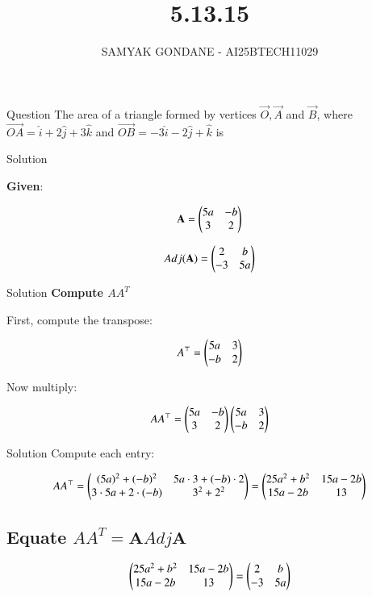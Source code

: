\documentclass{beamer}
\title 
{5.13.15}
\date{}
\author
{SAMYAK GONDANE - AI25BTECH11029}
\begin{document}
\frame{\titlepage}

\begin{frame}{Question}
The area of a triangle formed by vertices $\vec{O}, \vec{A}$ and $\vec{B}$, where $\vec{OA} = \hat{i} + 2\hat{j} + 3\hat{k}$ and $\vec{OB} = -3\hat{i} - 2\hat{j} + \hat{k}$ is
\end{frame}


\begin{frame}{Solution}

\textbf{Given}:

\begin{align}
\textbf{A} = \begin{pmatrix} 5a & -b \\ 3 & 2 \end{pmatrix}
\end{align}


\begin{align}
Adj(\textbf{A}) = \begin{pmatrix} 2 & b \\ -3 & 5a \end{pmatrix}
\end{align}
\end{frame}


\begin{frame}{Solution}
\textbf{Compute $AA^T$}

First, compute the transpose:

\begin{align}
A^\top = \begin{pmatrix} 5a & 3 \\ -b & 2 \end{pmatrix}
\end{align}

Now multiply:

\begin{align}
AA^\top = \begin{pmatrix} 5a & -b \\ 3 & 2 \end{pmatrix} \begin{pmatrix} 5a & 3 \\ -b & 2 \end{pmatrix}
\end{align}
\end{frame}


\begin{frame}{Solution}
Compute each entry:

\begin{align}
AA^\top = \begin{pmatrix}
(5a)^2 + (-b)^2 & 5a \cdot 3 + (-b) \cdot 2 \\
3 \cdot 5a + 2 \cdot (-b) & 3^2 + 2^2
\end{pmatrix}
= \begin{pmatrix}
25a^2 + b^2 & 15a - 2b \\
15a - 2b & 13
\end{pmatrix}
\end{align}

\subsection*{Equate $AA^T = \textbf{A}Adj\textbf{A}$}


\begin{align}
\begin{pmatrix}
25a^2 + b^2 & 15a - 2b \\
15a - 2b & 13
\end{pmatrix}
=
\begin{pmatrix}
2 & b \\
-3 & 5a
\end{pmatrix}
\end{align}\\


\end{frame}
\end{document}
